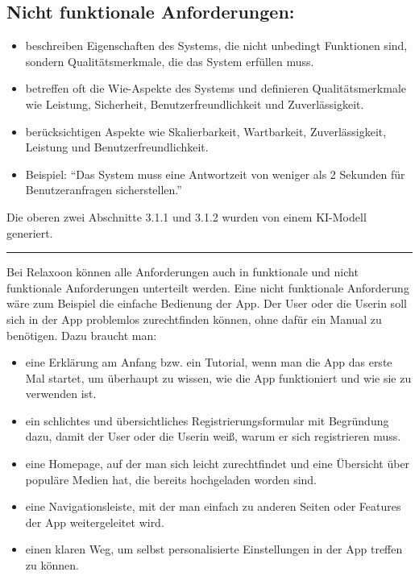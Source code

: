 \subsection{Nicht funktionale Anforderungen:}
\begin{itemize}
  \item beschreiben Eigenschaften des Systems, die nicht unbedingt Funktionen sind, sondern Qualitätsmerkmale, die das System erfüllen muss.
  \item betreffen oft die Wie-Aspekte des Systems und definieren Qualitätsmerkmale wie Leistung, Sicherheit, Benutzerfreundlichkeit und Zuverlässigkeit.
  \item berücksichtigen Aspekte wie Skalierbarkeit, Wartbarkeit, Zuverlässigkeit, Leistung und Benutzerfreundlichkeit.
  \item Beispiel: "`Das System muss eine Antwortzeit von weniger als 2 Sekunden für Benutzeranfragen sicherstellen."'
\end{itemize}

Die oberen zwei Abschnitte 3.1.1 und 3.1.2 wurden von einem KI-Modell generiert.\cite{chatgpt}

\rule{\linewidth}{0.5pt}

Bei Relaxoon können alle Anforderungen auch in funktionale und nicht funktionale Anforderungen unterteilt werden.
Eine nicht funktionale Anforderung wäre zum Beispiel die einfache Bedienung der App. Der User oder die Userin
soll sich in der App problemlos zurechtfinden können, ohne dafür ein Manual zu benötigen. Dazu braucht man:
\begin{itemize}
      \item eine Erklärung am Anfang bzw. ein Tutorial, wenn man die App das erste Mal startet, um überhaupt 
      zu wissen, wie die App funktioniert und wie sie zu verwenden ist.
      \item ein schlichtes und übersichtliches Registrierungsformular mit Begründung dazu, damit der User oder
      die Userin weiß, warum er sich registrieren muss.
      \item eine Homepage, auf der man sich leicht zurechtfindet und eine Übersicht über populäre Medien hat, die
      bereits hochgeladen worden sind.
      \item eine Navigationsleiste, mit der man einfach zu anderen Seiten oder Features der App weitergeleitet wird.
      \item einen klaren Weg, um selbst personalisierte Einstellungen in der App treffen zu können. 
\end{itemize}

